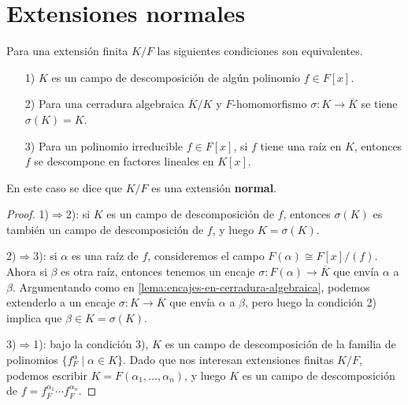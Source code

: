 
\section{Extensiones normales}

\begin{proposicion-definicion}
  Para una extensión finita $K/F$ las siguientes condiciones son equivalentes.

  \begin{enumerate}
  \item[1)] $K$ es un campo de descomposición de algún polinomio $f \in F[x]$.

  \item[2)] Para una cerradura algebraica $\overline{K}/K$ y $F$-homomorfismo
    $\sigma\colon K\to \overline{K}$ se tiene $\sigma (K) = K$.

  \item[3)] Para un polinomio irreducible $f \in F[x]$, si $f$ tiene una raíz en
    $K$, entonces $f$ se descompone en factores lineales en $K[x]$.
  \end{enumerate}

  En este caso se dice que $K/F$ es una extensión \textbf{normal}.

  \begin{proof}
    1)$\Rightarrow$2): si $K$ es un campo de descomposición de $f$, entonces
    $\sigma (K)$ es también un campo de descomposición de $f$, y luego
    $K = \sigma (K)$.

    2)$\Rightarrow$3): si $\alpha$ es una raíz de $f$, consideremos el campo
    $F (\alpha) \cong F[x]/(f)$. Ahora si $\beta$ es otra raíz, entonces tenemos
    un encaje $\sigma\colon F (\alpha) \to \overline{K}$ que envía
    $\alpha$ a $\beta$. Argumentando como en
    \ref{lema:encajes-en-cerradura-algebraica}, podemos extenderlo a un encaje
    $\sigma\colon K\to \overline{K}$ que envía $\alpha$ a $\beta$, pero luego
    la condición 2) implica que $\beta \in K = \sigma (K)$.

    3)$\Rightarrow$1): bajo la condición 3), $K$ es un campo de descomposición
    de la familia de polinomios $\{ f^\alpha_F \mid \alpha \in K \}$. Dado que
    nos interesan extensiones finitas $K/F$, podemos escribir
    $K = F (\alpha_1,\ldots,\alpha_n)$, y luego $K$ es un campo de
    descomposición de $f = f^{\alpha_1}_F \cdots f^{\alpha_n}_F$.
  \end{proof}
\end{proposicion-definicion}

